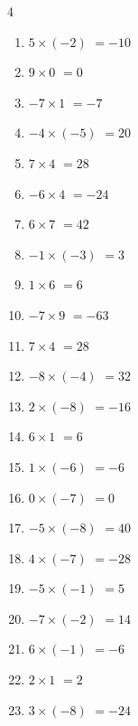 \begin{multicols}{4}
\begin{enumerate}
  \item $5\times (-2)$
        $=-10$

  \item $9\times 0$
        $=0$

  \item $-7\times 1$
        $=-7$

  \item $-4\times (-5)$
        $=20$

  \item $7\times 4$
        $=28$

  \item $-6\times 4$
        $=-24$

  \item $6\times 7$
        $=42$

  \item $-1\times (-3)$
        $=3$

  \item $1\times 6$
        $=6$

  \item $-7\times 9$
        $=-63$

  \item $7\times 4$
        $=28$

  \item $-8\times (-4)$
        $=32$

  \item $2\times (-8)$
        $=-16$

  \item $6\times 1$
        $=6$

  \item $1\times (-6)$
        $=-6$

  \item $0\times (-7)$
        $=0$

  \item $-5\times (-8)$
        $=40$

  \item $4\times (-7)$
        $=-28$

  \item $-5\times (-1)$
        $=5$

  \item $-7\times (-2)$
        $=14$

  \item $6\times (-1)$
        $=-6$

  \item $2\times 1$
        $=2$

  \item $3\times (-8)$
        $=-24$


\end{enumerate}
\end{multicols}
